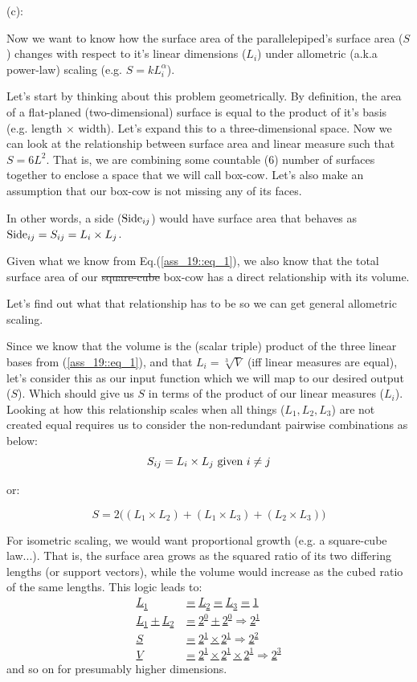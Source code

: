 \begin{enumerate}
\clearpage
   
(c):

Now we want to know how the surface area of the parallelepiped's surface area ($S$) changes with respect to it's linear dimensions ($L_{i}$) under allometric (a.k.a power-law) scaling (e.g. $S = k L_{i}^{\alpha}$).

Let's start by thinking about this problem geometrically.
By definition,
the area of a flat-planed (two-dimensional) surface is equal to the product of it's basis (e.g. length $\times$ width).
Let's expand this to a three-dimensional space.
Now we can look at the relationship between surface area and linear measure such that $S = 6 L^2$.
That is,
we are combining some countable ($6$) number of surfaces together to enclose a space that we will call box-cow.
Let's also make an assumption that our box-cow is not missing any of its faces.

In other words,
a side ($\textnormal{Side}_{ij}$) would have surface area that behaves as $\textnormal{Side}_{ij} = S_{ij} = L_i \times L_{j}$.

Given what we know from Eq.(\ref{ass_19::eq_1}),
we also know that the total surface area of our \sout{square-cube} box-cow has a direct relationship with its volume.

Let's find out what that relationship has to be so we can get general allometric scaling.

Since we know that the volume is the (scalar triple) product of the three linear bases from (\ref{ass_19::eq_1}), 
and that $L_i=\sqrt[3]{V}$ (iff linear measures are equal), 
let's consider this as our input function which we will map to our desired output ($S$). 
Which should give us $S$ in terms of the product of our linear measures ($L_{i}$).
Looking at how this relationship scales when all things ($L_1, L_2, L_3$) are not created equal requires us to consider the non-redundant pairwise combinations as below:
$$
   S_{ij} = L_i \times L_j \textnormal{ given } i \neq j
$$

or:

$$
   S = 2
   \bigg(
   (L_1 \times L_2) +
   (L_1 \times L_3) +
   (L_2 \times L_3)
   \bigg)
$$

For isometric scaling, 
we would want proportional growth (e.g. a square-cube law...). 
That is, 
the surface area grows as the squared ratio of its two differing lengths (or support vectors), 
while the volume would increase as the cubed ratio of the same lengths.
This logic leads to:
\hyperlink{isometric}{
\begin{align*}
    L_1 &= L_2 = L_3 = 1\\
    L_1 + L_2 &= 2^0 + 2^0 \Rightarrow 2^1\\
    S &= 2^1 \times 2^1 \Rightarrow 2^2\\
    V &= 2^1 \times 2^1 \times 2^1 \Rightarrow 2^3
\end{align*}}
and so on for presumably higher dimensions.


\end{enumerate}
